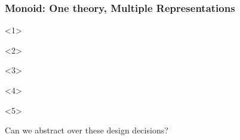 \documentclass[t,10pt,numbers,fleqn,usenames,xcolor=dvipsnames]{beamer}
\begin{document}

\begin{frame}[fragile]
\frametitle{Monoid: One theory, Multiple Representations} 
\begin{onlyenv}<1>
\begin{figure}
  \scalebox{.95}{}
\end{figure}
\end{onlyenv}
\begin{onlyenv}<2>
\begin{figure}
  \scalebox{.95}{}
\end{figure}
\end{onlyenv}
\begin{onlyenv}<3>
\begin{figure}
  \scalebox{.95}{}
\end{figure}
\end{onlyenv}
\begin{onlyenv}<4>
\begin{figure}
  \scalebox{.95}{}
\end{figure}
\end{onlyenv}
\begin{onlyenv}<5>
\begin{figure}
  \scalebox{.95}{}
\end{figure}
\pause
Can we abstract over these design decisions? 
\end{onlyenv}
\end{frame}
\end{document}
